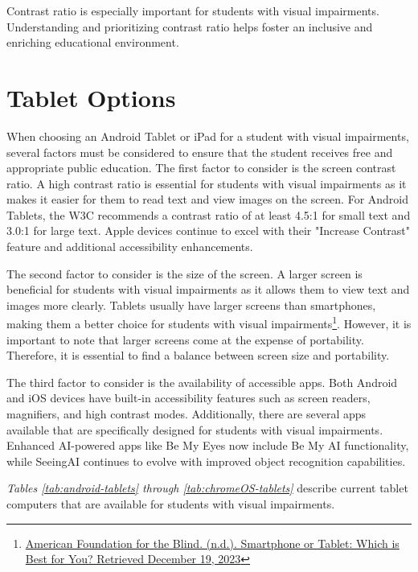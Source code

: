 Contrast ratio is especially important for students with visual impairments. Understanding and prioritizing contrast ratio helps foster an inclusive and enriching educational environment.

\section{Tablet Options}\label{tab:tablet-options}
When choosing an Android Tablet or iPad for a student with visual impairments, several factors must be considered to ensure that the student receives free and appropriate public education. The first factor to consider is the screen contrast ratio. A high contrast ratio is essential for students with visual impairments as it makes it easier for them to read text and view images on the screen. For Android Tablets, the W3C recommends a contrast ratio of at least 4.5:1 for small text and 3.0:1 for large text.
\cite{GoogleColorContrast}
Apple devices continue to excel with their "Increase Contrast" feature and additional accessibility enhancements.
\cite{iMoreContrast}

The second factor to consider is the size of the screen. A larger screen is beneficial for students with visual impairments as it allows them to view text and images more clearly. Tablets usually have larger screens than smartphones, making them a better choice for students with visual impairments\footnote{\raggedright \href{https://www.afb.org/blindness-and-low-vision/using-technology/cell-phones-tablets-mobile/smartphone-or-tablet-which}{American Foundation for the Blind. (n.d.). Smartphone or Tablet: Which is Best for You? Retrieved December 19, 2023}}. However, it is important to note that larger screens come at the expense of portability. Therefore, it is essential to find a balance between screen size and portability.

The third factor to consider is the availability of accessible apps. Both Android and iOS devices have built-in accessibility features such as screen readers, magnifiers, and high contrast modes.
\cite{AAOApps}
\cite{AFBiOS}
Additionally, there are several apps available that are specifically designed for students with visual impairments. Enhanced AI-powered apps like Be My Eyes now include Be My AI functionality, while SeeingAI continues to evolve with improved object recognition capabilities.
\cite{AAOTechnologyTools}

\emph{Tables \ref{tab:android-tablets} through \ref{tab:chromeOS-tablets}} describe current tablet computers that are available for students with visual impairments.

